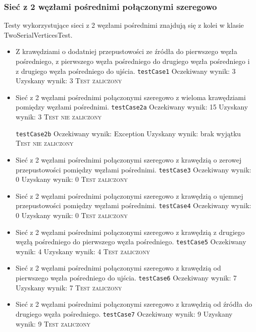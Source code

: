 \subsubsection{Sieć z 2 węzłami pośrednimi połączonymi szeregowo}
Testy wykorzystujące sieci z 2 węzłami pośrednimi znajdują się z kolei w klasie
TwoSerialVerticesTest.
\begin{itemize}[nosep]
    \item Z krawędziami o dodatniej przepustowości ze źródła do pierwszego węzła
    pośredniego, z pierwszego węzła pośredniego do drugiego węzła pośredniego i z
    drugiego węzła pośredniego do ujścia.
    \texttt{testCase1}
    Oczekiwany wynik: 3
    Uzyskany wynik: 3
    \textsc{Test zaliczony}

    \item Sieć z 2 węzłami pośrednimi połączonymi szeregowo z wieloma
    krawędziami pomiędzy węzłami pośrednimi.
    \texttt{testCase2a}
    Oczekiwany wynik: 15
    Uzyskany wynik: 3
    \textsc{Test nie zaliczony}

    \texttt{testCase2b}
    Oczekiwany wynik: Exception
    Uzyskany wynik: brak wyjątku
    \textsc{Test nie zaliczony}

    \item Sieć z 2 węzłami pośrednimi połączonymi szeregowo z krawędzią o
    zerowej przepustowości pomiędzy węzłami pośrednimi.
    \texttt{testCase3}
    Oczekiwany wynik: 0
    Uzyskany wynik: 0
    \textsc{Test zaliczony}

    \item Sieć z 2 węzłami pośrednimi połączonymi szeregowo z krawędzią o
    ujemnej przepustowości pomiędzy węzłami pośrednimi.
    \texttt{testCase4}
    Oczekiwany wynik: 0
    Uzyskany wynik: 0
    \textsc{Test zaliczony}

    \item Sieć z 2 węzłami pośrednimi połączonymi szeregowo z krawędzią z
    drugiego węzłą pośredniego do pierwszego węzła pośredniego.
    \texttt{testCase5}
    Oczekiwany wynik: 4
    Uzyskany wynik: 4
    \textsc{Test zaliczony}

    \item Sieć z 2 węzłami pośrednimi połączonymi szeregowo z krawędzią od
    pierwszego węzła pośredniego do ujścia.
    \texttt{testCase6}
    Oczekiwany wynik: 7
    Uzyskany wynik: 7
    \textsc{Test zaliczony}


    \item Sieć z 2 węzłami pośrednimi połączonymi szeregowo z krawędzią od
    źródła do drugiego węzła pośredniego.
    \texttt{testCase7}
    Oczekiwany wynik: 9
    Uzyskany wynik: 9
    \textsc{Test zaliczony}


\end{itemize}


